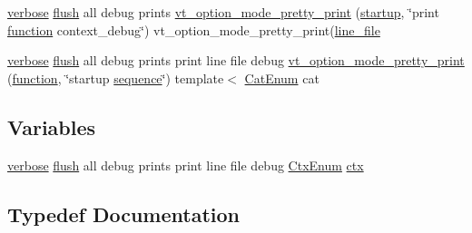 \begin{DoxyCompactItemize}
\item 
\hyperlink{namespacevt_1_1config_a724e99568632cc0fe9c456c2230270d0a9b54bf70f7b7fe7cfb6f3da0e167ae27}{verbose} \hyperlink{namespacevt_1_1config_a724e99568632cc0fe9c456c2230270d0a5c484f36b0f33ded7e640cc30fe5e725}{flush} all debug prints \hyperlink{namespacevt_1_1config_a8019230f6479fd998e4fd0f33a26a1a6}{vt\+\_\+option\+\_\+mode\+\_\+pretty\+\_\+print} (\hyperlink{namespacevt_1_1config_a724e99568632cc0fe9c456c2230270d0ad6e94cfdf66c00de0a906cec0f346d6b}{startup}, \char`\"{}print \hyperlink{namespacevt_1_1config_a724e99568632cc0fe9c456c2230270d0a479a398ca7c07756b7f07ee19cb9b183}{function} context\+\_\+debug\char`\"{}) vt\+\_\+option\+\_\+mode\+\_\+pretty\+\_\+print(\hyperlink{namespacevt_1_1config_a724e99568632cc0fe9c456c2230270d0a761d0adb1e300a27f04ef50f3fff51f6}{line\+\_\+file}
\item 
\hyperlink{namespacevt_1_1config_a724e99568632cc0fe9c456c2230270d0a9b54bf70f7b7fe7cfb6f3da0e167ae27}{verbose} \hyperlink{namespacevt_1_1config_a724e99568632cc0fe9c456c2230270d0a5c484f36b0f33ded7e640cc30fe5e725}{flush} all debug prints print line file debug \hyperlink{namespacevt_1_1config_a287e502bd7dbdc1f80e3cadf4993d9ea}{vt\+\_\+option\+\_\+mode\+\_\+pretty\+\_\+print} (\hyperlink{namespacevt_1_1config_a724e99568632cc0fe9c456c2230270d0a479a398ca7c07756b7f07ee19cb9b183}{function}, \char`\"{}startup \hyperlink{namespacevt_1_1config_a6bd1d6215bda0d8ca02811798399f689aa8d88819a9eaa5f03b8432110059234c}{sequence}\char`\"{}) template$<$ \hyperlink{namespacevt_1_1config_a6bd1d6215bda0d8ca02811798399f689}{Cat\+Enum} cat
\end{DoxyCompactItemize}
\subsection*{Variables}
\begin{DoxyCompactItemize}
\item 
\hyperlink{namespacevt_1_1config_a724e99568632cc0fe9c456c2230270d0a9b54bf70f7b7fe7cfb6f3da0e167ae27}{verbose} \hyperlink{namespacevt_1_1config_a724e99568632cc0fe9c456c2230270d0a5c484f36b0f33ded7e640cc30fe5e725}{flush} all debug prints print line file debug \hyperlink{namespacevt_1_1config_a46e57c33bee1b9f1fa95455af86d80e0}{Ctx\+Enum} \hyperlink{namespacevt_1_1config_a0551245b6b893932b95aaf8eac94eed1}{ctx}
\end{DoxyCompactItemize}


\subsection{Typedef Documentation}
\mbox{\label{namespacevt_1_1config_a889b68143f3ecf39ea84dadfb9dfda3f}} 
